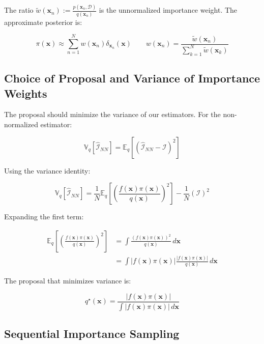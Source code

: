 \documentclass[11pt,a4paper]{article}
\begin{document}
The ratio $\tilde{w}(\mathbf{x}_n) := \frac{p(\mathbf{x}_n, \mathcal{D})}{q(\mathbf{x}_n)}$ is the unnormalized importance weight. The approximate posterior is:

\begin{equation}
\pi(\mathbf{x}) \approx \sum_{n=1}^{N} w(\mathbf{x}_n) \delta_{\mathbf{x}_n}(\mathbf{x}) \qquad w(\mathbf{x}_n) = \frac{\tilde{w}(\mathbf{x}_n)}{\sum_{k=1}^{N} \tilde{w}(\mathbf{x}_k)}
\end{equation}

\subsection{Choice of Proposal and Variance of Importance Weights}

The proposal should minimize the variance of our estimators. For the non-normalized estimator:

\begin{equation}
\mathbb{V}_q[\widehat{\mathcal{I}}_{NN}] = \mathbb{E}_q\left[\left(\widehat{\mathcal{I}}_{NN} - \mathcal{I}\right)^2\right]
\end{equation}

Using the variance identity:

\begin{equation}
\mathbb{V}_q[\widehat{\mathcal{I}}_{NN}] = \frac{1}{N} \mathbb{E}_q\left[\left(\frac{f(\mathbf{x})\pi(\mathbf{x})}{q(\mathbf{x})}\right)^2\right] - \frac{1}{N}(\mathcal{I})^2
\end{equation}

Expanding the first term:

\begin{align}
\mathbb{E}_q\left[\left(\frac{f(\mathbf{x})\pi(\mathbf{x})}{q(\mathbf{x})}\right)^2\right] &= \int \frac{(f(\mathbf{x})\pi(\mathbf{x}))^2}{q(\mathbf{x})} \, d\mathbf{x} \nonumber \\
&= \int |f(\mathbf{x})\pi(\mathbf{x})| \frac{|f(\mathbf{x})\pi(\mathbf{x})|}{q(\mathbf{x})} \, d\mathbf{x}
\label{eq:variance_expansion}
\end{align}

The proposal that minimizes variance is:

\begin{equation}
q^{\star}(\mathbf{x}) = \frac{|f(\mathbf{x})\pi(\mathbf{x})|}{\int |f(\mathbf{x})\pi(\mathbf{x})| \, d\mathbf{x}}
\end{equation}

\subsection{Sequential Importance Sampling}
\end{document}
